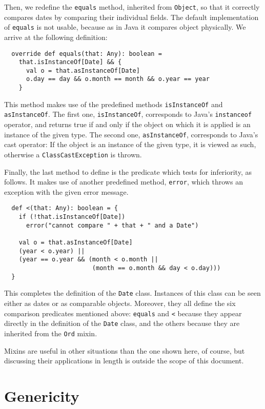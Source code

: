 \documentclass[a4paper,12pt,twoside,titlepage]{article}
\begin{document}
Then, we redefine the \lstinline?equals? method, inherited from
\lstinline?Object?, so that it correctly compares dates by comparing their
individual fields. The default implementation of \lstinline?equals? is not
usable, because as in Java it compares object physically. We arrive
at the following definition:
\begin{lstlisting}
  override def equals(that: Any): boolean =
    that.isInstanceOf[Date] && {
      val o = that.asInstanceOf[Date]
      o.day == day && o.month == month && o.year == year
    }
\end{lstlisting}
This method makes use of the predefined methods \lstinline?isInstanceOf?
and \lstinline?asInstanceOf?. The first one, \lstinline?isInstanceOf?,
corresponds to Java's \lstinline?instanceof? operator, and returns true
if and only if the object on which it is applied is an instance of the
given type. The second one, \lstinline?asInstanceOf?, corresponds to
Java's cast operator: If the object is an instance of the given type,
it is viewed as such, otherwise a \lstinline?ClassCastException? is
thrown.

Finally, the last method to define is the predicate which tests for
inferiority, as follows. It makes use of another predefined method,
\lstinline?error?, which throws an exception with the given error message.
\begin{lstlisting}
  def <(that: Any): boolean = {
    if (!that.isInstanceOf[Date])
      error("cannot compare " + that + " and a Date")

    val o = that.asInstanceOf[Date]
    (year < o.year) ||
    (year == o.year && (month < o.month ||
                        (month == o.month && day < o.day)))
  }
\end{lstlisting}
This completes the definition of the \lstinline?Date? class. Instances of
this class can be seen either as dates or as comparable objects.
Moreover, they all define the six comparison predicates mentioned
above: \lstinline?equals? and \lstinline?<? because they appear directly in
the definition of the \lstinline?Date? class, and the others because they
are inherited from the \lstinline?Ord? mixin.

Mixins are useful in other situations than the one shown here, of
course, but discussing their applications in length is outside the
scope of this document.

\section{Genericity}
\label{sec:genericity}
\end{document}

